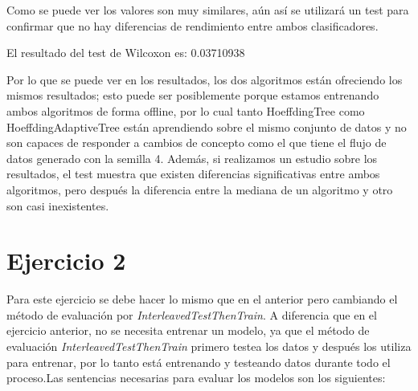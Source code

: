 Como se puede ver los valores son muy similares, aún así se utilizará un test para confirmar que no hay diferencias de rendimiento entre ambos clasificadores.

\begin{figure}[H]
	\centering
\end{figure}

El resultado del test de Wilcoxon es: 0.03710938

Por lo que se puede ver en los resultados, los dos algoritmos están ofreciendo los mismos resultados; esto puede ser posiblemente porque estamos entrenando ambos algoritmos de forma offline, por lo cual tanto HoeffdingTree como HoeffdingAdaptiveTree están aprendiendo sobre el mismo conjunto de datos y no son capaces de responder a cambios de concepto como el que tiene el flujo de datos generado con la semilla 4. Además, si realizamos un estudio sobre los resultados, el test muestra que existen diferencias significativas entre ambos algoritmos, pero después la diferencia entre la mediana de un algoritmo y otro son casi inexistentes.

\section{Ejercicio 2}
Para este ejercicio se debe hacer lo mismo que en el anterior pero cambiando el método de evaluación por \textit{InterleavedTestThenTrain}. A diferencia que en el ejercicio anterior, no se necesita entrenar un modelo, ya que el método de evaluación \textit{InterleavedTestThenTrain} primero testea los datos y después los utiliza para entrenar, por lo tanto está entrenando y testeando datos durante todo el proceso.Las sentencias necesarias para evaluar los modelos son los siguientes:
\vspace{0.06in}

